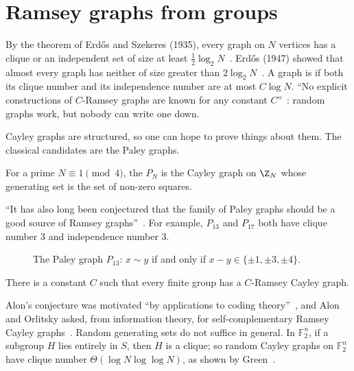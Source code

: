 \section{Ramsey graphs from groups}\label{sec:ramsey}

By the theorem of Erd\H{o}s and Szekeres (1935), every graph on $N$ vertices has a clique or an independent set of size at least $\frac12\log_2N$~\cite[\S1.1]{sch25}. Erd\H{o}s (1947) showed that almost every graph has neither of size greater than $2\log_2N$~\cite[\S1]{cfpy24}. A graph is  if both its clique number and its independence number are at most $C\log N$. ``No explicit constructions of $C$-Ramsey graphs are known for any constant $C$''~\cite[\S1.1]{sch25}: random graphs work, but nobody can write one down.

Cayley graphs are structured, so one can hope to prove things about them. The classical candidates are the Paley graphs.

\begin{definition}\label{def:paley}
For a prime $N\equiv1\pmod4$, the  $P_N$ is the Cayley graph on $\Z_N$ whose generating set is the set of non-zero squares.
\end{definition}

``It has also long been conjectured that the family of Paley graphs should be a good source of Ramsey graphs''~\cite[\S1]{cfpy24}. For example, $P_{13}$ and $P_{17}$ both have clique number $3$ and independence number $3$.

\begin{figure}[ht]
\centering

\caption{The Paley graph $P_{13}$: $x\sim y$ if and only if $x-y\in\{\pm1,\pm3,\pm4\}$.}
\label{fig:paley}
\end{figure}

\begin{conjecture}\label{conj:alon}
There is a constant $C$ such that every finite group has a $C$-Ramsey Cayley graph.
\end{conjecture}

Alon's conjecture was motivated ``by applications to coding theory''~\cite[\S1.1]{sch25}, and Alon and Orlitsky asked, from information theory, for self-complementary Ramsey Cayley graphs~\cite[\S1]{cfpy24}. Random generating sets do not suffice in general. In $\mathbb F_2^n$, if a subgroup $H$ lies entirely in $S$, then $H$ is a clique; so random Cayley graphs on $\mathbb F_2^n$ have clique number $\Theta(\log N\log\log N)$, as shown by Green~\cite[\S1.1]{cfpy24}.
